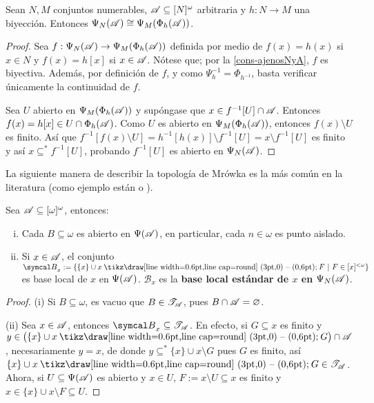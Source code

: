  \begin{proposicion}\label{prop-MrowHomeoBiyec}
  Sean $N,M$ conjuntos numerables, $\mathscr{A} \subseteq [N]^\omega$ arbitraria y $h:N \to M$ una biyección. Entonces $\Psi_N(\mathscr{A}) \cong \Psi_M(\Phi_h(\mathscr{A}))$.
 \end{proposicion}
 \begin{proof} 
  Sea $f:\Psi_N(\mathscr{A}) \to \Psi_M(\Phi_h(\mathscr{A}))$ definida por medio de $f(x)=h(x)$ si $x \in N$ y $f(x)=h[x]$ si $x \in \mathscr{A}$. Nótese que; por la \autoref{cons-ajenosNyA}, $f$ es biyectiva. Además, por definición de $f$, y como $\Psi_h^{-1}=\Phi_{h^{-1}}$, basta verificar únicamente la continuidad de $f$.
 
  Sea $U$ abierto en $\Psi_M(\Phi_h(\mathscr{A}))$ y supóngase que $x \in f^{-1}[U] \cap \mathscr{A}$. Entonces $f(x) = h[x] \in U \cap \Phi_h(\mathscr{A})$. Como $U$ es abierto en $\Psi_M(\Phi_h(\mathscr{A}))$, entonces $f(x) \setminus U$ es finito. Así que $f^{-1}[f(x) \setminus U] = h^{-1}[h(x)] \setminus f^{-1}[U] = x \setminus f^{-1}[U]$ es finito y así $x \subseteq^* f^{-1}[U]$, probando $f^{-1}[U]$ es abierto en $\Psi_N(\mathscr{A})$.
 \end{proof}
 
 La siguiente manera de describir la topología de Mrówka es la más común en la literatura (como ejemplo están \cite{hruMrowka} o \cite{hruAlmost}).

 \begin{proposicion}\label{prop-BaseLocMrowka}
  Sea $\mathscr{A} \subseteq [\omega]^\omega$, entonces:
  \begin{enumerate}[i)]
   \item Cada $B \subseteq \omega$ es abierto en $\Psi(\mathscr{A})$, en particular, cada $n \in \omega$ es punto aislado.
   \item Si $x \in \mathscr{A}$, el conjunto $\mathcal{B}_x:=\{ \{x\} \cup x \setminus F \tq F \in[x]^{<\omega} \}$ es base local de $x$ en $\Psi(\mathscr{A})$. $\mathcal{B}_x$ es la \textbf{base local estándar de $x$ en $\Psi_N(\mathscr{A})$}.
  \end{enumerate}
 \end{proposicion}
 \begin{proof} 
  (i) Si $B \subseteq \omega$, es vacuo que $B \in \mathscr{T}_{\mathscr{A}}$, pues $B \cap \mathscr{A} = \varnothing$.
 
  (ii) Sea $x \in \mathscr{A}$, entonces $\mathcal{B}_x \subseteq \tau_\ms{A}$. En efecto, si $G \subseteq x$ es finito y $y \in \big( \{x\} \cup x \setminus G \big) \cap \ms{A}$, necesariamente $y=x$, de donde $y \subseteq^* \{x\} \cup x \setminus G$ pues $G$ es finito, así $\{x\} \cup x \setminus G \in \tau_{\ms{A}}$. Ahora, si $U \subseteq \Psi(\mathscr{A)}$ es abierto y $x \in U$, $F:= x \setminus U \subseteq x$ es finito y $x \in \{x\} \cup x \setminus F \subseteq U$.
 \end{proof} 
  
